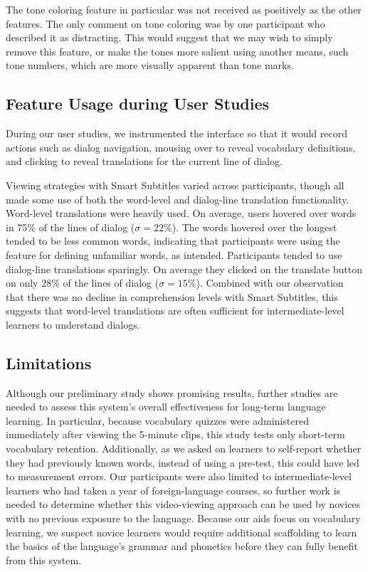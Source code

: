 \documentclass{sigchi}
\begin{document}
The tone coloring feature in particular was not received as positively as the other features. The only comment on tone coloring was by one participant who described it as distracting. This would suggest that we may wish to simply remove this feature, or make the tones more salient using another means, such tone numbers, which are more visually apparent than tone marks.
	 	 	

\subsection{Feature Usage during User Studies}

During our user studies, we instrumented the interface so that it would record actions such as dialog navigation, mousing over to reveal vocabulary definitions, and clicking to reveal translations for the current line of dialog.

Viewing strategies with Smart Subtitles varied across
participants, though all made some use of both
the word-level and dialog-line translation functionality.
Word-level translations were heavily used. On average,
users hovered over words in 75\% of the lines of dialog
($\sigma = 22\%$).
The words hovered over the longest tended to be less
common words, indicating that participants were using
the feature for defining unfamiliar words, as intended.
Participants tended to use dialog-line translations
sparingly. On average they clicked on the translate
button on only $28\%$ of the lines of dialog
($\sigma = 15\%$).
Combined with our observation that there was no decline in
comprehension levels with Smart Subtitles, this suggests
that word-level translations are often sufficient for
intermediate-level learners to understand dialogs.

\subsection{Limitations}

Although our preliminary study shows promising results,
further studies are needed to assess
this system's overall effectiveness for long-term language learning.
In particular, because vocabulary quizzes were administered immediately
after viewing the 5-minute clips,
this study tests only short-term vocabulary retention.
Additionally, as we asked on learners to self-report whether they had previously known words,
instead of using a pre-test,
this could have led to measurement errors.
Our participants were also limited to intermediate-level learners who had taken a year
of foreign-language courses,
so further work is needed to determine whether this video-viewing approach can be used by
novices with no previous exposure to the language.
Because our aids focus on vocabulary learning,
we suspect novice
learners would require additional scaffolding to learn
the basics of the language's grammar and phonetics
before they can fully benefit from this system.
\end{document}
